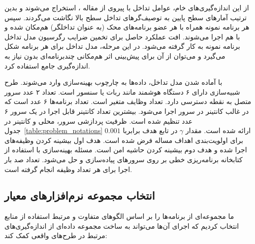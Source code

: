 از این اندازه‌گیری‌های خام، عوامل تداخل با پیروی از مقاله \cite{medel2023modeling}، استخراج می‌شوند و بدین ترتیب آمارهای سطح پایین به توصیف‌گرهای تداخل سطح بالا نگاشت می‌گردند. سپس هر برنامه نمونه همراه با هر عضو برنامه‌های محک (به عنوان تداخلگر) هم‌مکان‌ شده و با هم اجرا می‌شوند. افت عملکرد حاصل برای تخمین ضرایب رگرسیون مدل تداخل برنامه نمونه به کار گرفته می‌شود. در این مرحله، مدل تداخل برای هر برنامه شکل می‌گیرد و می‌توان از آن برای پیش‌بینی اثر هم‌مکانی چندبرنامه‌ای بدون نیاز به اندازه‌گیری جامع استفاده کرد.

با آماده شدن مدل تداخل، داده‌ها به چارچوب بهینه‌سازی وارد می‌شوند. طرح شبیه‌سازی دارای ۶ دستگاه هوشمند مانند ربات‌ یا سنسور است. تعداد ۲ عدد سرور متصل به نقطه دسترسی دارد. تعداد وظایف متغیر است. تعداد برنامه‌ها ۶ عدد است که در غالب کانتینر در سرور اجرا می‌شود. بیشترین تعداد کانتینر قابل اجرا در یک سرور ۶ عدد تنظیم شده است. ظرفیت پردازشی سرور، محلی و کانتینر در جدول~\ref{table:problem_notations} ارائه شده است. مقدار $\gamma$ در تابع هدف برابربا $0.001$ برای اولویت‌بندی اهداف مساله فرض شده است. هدف اول بیشینه کردن وظیفه‌های اجرا شده و هدف دوم بیشینه کردن حاشیه امن است. مسئله بهینه‌سازی با استفاده از کتابخانه برنامه‌ریزی خطی  بر روی سرورهای  پیاده‌سازی و حل می‌شود. تعداد صد بار اجرا برای هر تعداد وظیفه انجام گرفته است.

\subsection{انتخاب مجموعه نرم‌افزارهای معیار}

ما مجموعه‌ای از برنامه‌ها را بر اساس الگوهای متفاوت و مرتبط استفاده از منابع انتخاب کردیم که اجرای آن‌ها می‌تواند به ساخت مجموعه داده‌ای از اندازه‌گیری‌های مرتبط در طرح‌های واقعی کمک کند:

